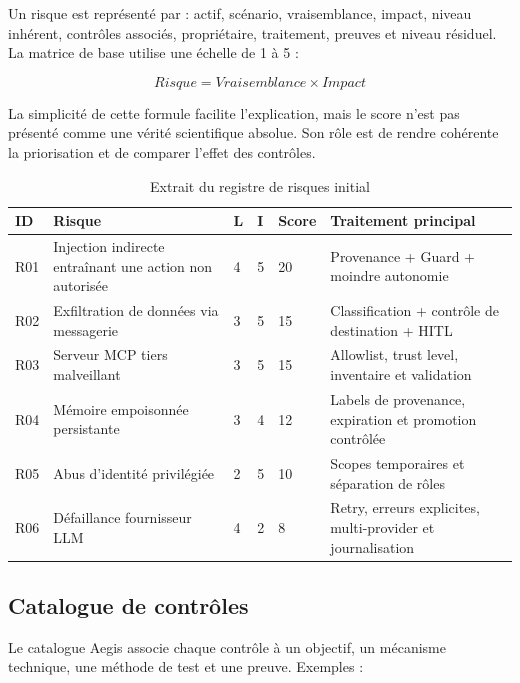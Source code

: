 Un risque est représenté par : actif, scénario, vraisemblance, impact, niveau inhérent, contrôles associés, propriétaire, traitement, preuves et niveau résiduel. La matrice de base utilise une échelle de 1 à 5 :

\begin{equation}
Risque = Vraisemblance \times Impact
\end{equation}

La simplicité de cette formule facilite l'explication, mais le score n'est pas présenté comme une vérité scientifique absolue. Son rôle est de rendre cohérente la priorisation et de comparer l'effet des contrôles.

\begin{table}[H]
\centering
\caption{Extrait du registre de risques initial}
\label{tab:risk-register}
\begin{tabularx}{\textwidth}{p{1.2cm} p{4.3cm} p{1.2cm} p{1.2cm} p{1.5cm} X}
\toprule
\textbf{ID} & \textbf{Risque} & \textbf{L} & \textbf{I} & \textbf{Score} & \textbf{Traitement principal} \\
\midrule
R01 & Injection indirecte entraînant une action non autorisée & 4 & 5 & 20 & Provenance + Guard + moindre autonomie \\
R02 & Exfiltration de données via messagerie & 3 & 5 & 15 & Classification + contrôle de destination + HITL \\
R03 & Serveur MCP tiers malveillant & 3 & 5 & 15 & Allowlist, trust level, inventaire et validation \\
R04 & Mémoire empoisonnée persistante & 3 & 4 & 12 & Labels de provenance, expiration et promotion contrôlée \\
R05 & Abus d'identité privilégiée & 2 & 5 & 10 & Scopes temporaires et séparation de rôles \\
R06 & Défaillance fournisseur LLM & 4 & 2 & 8 & Retry, erreurs explicites, multi-provider et journalisation \\
\bottomrule
\end{tabularx}
\end{table}

\subsection{Catalogue de contrôles}

Le catalogue Aegis associe chaque contrôle à un objectif, un mécanisme technique, une méthode de test et une preuve. Exemples :

